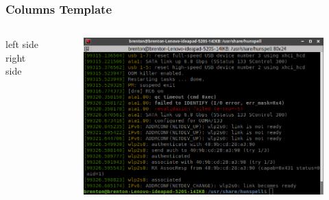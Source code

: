 \documentclass[14pt]{beamer}
\begin{document}
\begin{frame}
\frametitle{Columns Template}
\begin{columns}
\column{1.5in}
left side
\column{1.5in}
right side
\begin{figure}
\includegraphics[scale=0.2]{test}
\end{figure}
\end{columns}
\end{frame}
\end{document}
